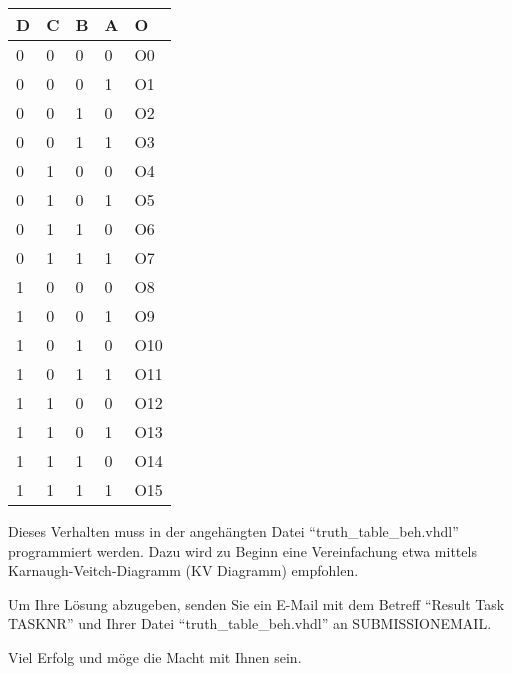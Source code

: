 \documentclass[a4paper,12pt]{article}
\begin{document}
\vspace{0.3cm}
\begin{center}
\begin{tabular}{||l | l | l | l || l||} 
	\hline
	D & C & B & A & O\\ [0.5ex] 
	\hline\hline
	0&0&0&0& {{ O0 }}
	\\
	\hline
	0&0&0&1& {{ O1 }}
	\\
	\hline
	0&0&1&0& {{ O2 }}
	\\
	\hline
	0&0&1&1& {{ O3 }}
	\\
	\hline\hline
	0&1&0&0& {{ O4 }}
	\\
	\hline
	0&1&0&1& {{ O5 }}
	\\
	\hline
	0&1&1&0& {{ O6 }}
	\\
	\hline
	0&1&1&1& {{ O7 }}
	\\
	\hline\hline
	1&0&0&0& {{ O8 }}
	\\
	\hline
	1&0&0&1& {{ O9 }}
	\\
	\hline
	1&0&1&0& {{ O10 }}
	\\
	\hline
	1&0&1&1& {{ O11 }}
	\\
	\hline\hline
	1&1&0&0& {{ O12 }}
	\\
	\hline
	1&1&0&1& {{ O13 }}
	\\
	\hline
	1&1&1&0& {{ O14 }}
	\\
	\hline
	1&1&1&1& {{ O15 }}
	\\
	\hline\hline
\end{tabular}
\end{center}

\vspace{0.3cm}

Dieses Verhalten muss in der angeh\"angten Datei "`truth\_table\_beh.vhdl"' programmiert werden. Dazu wird zu Beginn eine Vereinfachung etwa mittels Karnaugh-Veitch-Diagramm (KV Diagramm) empfohlen.

Um Ihre L\"osung abzugeben, senden Sie ein E-Mail mit dem Betreff "`Result Task {{TASKNR}}"' und Ihrer Datei "`truth\_table\_beh.vhdl"' an {{SUBMISSIONEMAIL}}. 

\vspace{0.7cm}
Viel Erfolg und m\"oge die Macht mit Ihnen sein.
\end{document}
